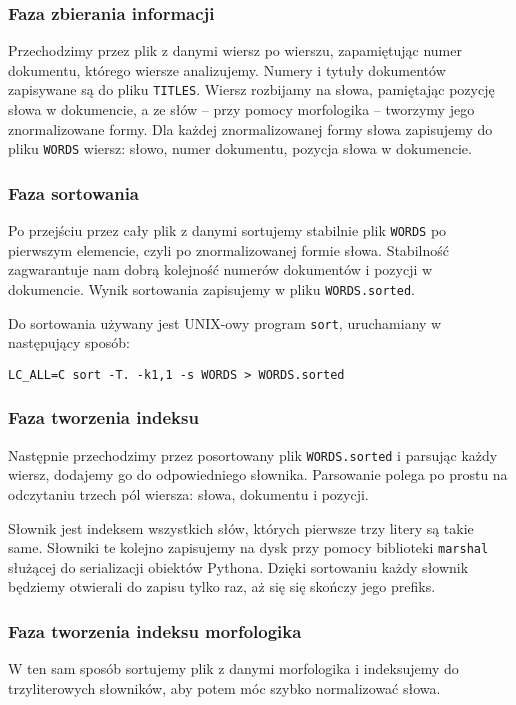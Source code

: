 \documentclass[11pt]{article}
\begin{document}
\subsubsection{Faza zbierania informacji}
Przechodzimy przez plik z danymi wiersz po wierszu, zapamiętując numer dokumentu, którego wiersze analizujemy. Numery i tytuły dokumentów zapisywane są do pliku \texttt{TITLES}. Wiersz rozbijamy na słowa, pamiętając pozycję słowa w dokumencie, a ze słów -- przy pomocy morfologika -- tworzymy jego znormalizowane formy. Dla każdej znormalizowanej formy słowa zapisujemy do pliku \texttt{WORDS} wiersz: słowo, numer dokumentu, pozycja słowa w dokumencie.

\subsubsection{Faza sortowania}
Po przejściu przez cały plik z danymi sortujemy stabilnie plik \texttt{WORDS} po pierwszym elemencie, czyli po znormalizowanej formie słowa. Stabilność zagwarantuje nam dobrą kolejność numerów dokumentów i pozycji w dokumencie. Wynik sortowania zapisujemy w pliku \texttt{WORDS.sorted}.

Do sortowania używany jest UNIX-owy program \texttt{sort}, uruchamiany w następujący sposób:
\begin{verbatim}
LC_ALL=C sort -T. -k1,1 -s WORDS > WORDS.sorted
\end{verbatim}

\subsubsection{Faza tworzenia indeksu}
Następnie przechodzimy przez posortowany plik \texttt{WORDS.sorted} i parsując każdy wiersz, dodajemy go do odpowiedniego słownika. Parsowanie polega po prostu na odczytaniu trzech pól wiersza: słowa, dokumentu i pozycji.

Słownik jest indeksem wszystkich słów, których pierwsze trzy litery są takie same. Słowniki te kolejno zapisujemy na dysk przy pomocy biblioteki \texttt{marshal} służącej do serializacji obiektów Pythona. Dzięki sortowaniu każdy słownik będziemy otwierali do zapisu tylko raz, aż się się skończy jego prefiks. 

\subsubsection{Faza tworzenia indeksu morfologika}
W ten sam sposób sortujemy plik z danymi morfologika i indeksujemy do trzyliterowych słowników, aby potem móc szybko normalizować słowa.
\end{document}
